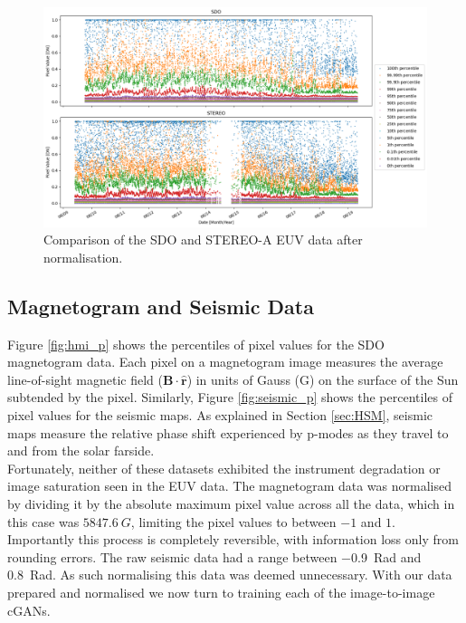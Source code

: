 \documentclass[11pt,a4paper,onecolumn]{report}
\begin{document}
\begin{figure}[t]
  \centering
  \includegraphics[width=\linewidth]{AIA_STEREO_normalised.png}
  \caption{Comparison of the SDO and STEREO-A EUV data after normalisation.}
  \label{fig:sdo_stereo_comparison}
\end{figure}



\subsection{Magnetogram and Seismic Data}
Figure \ref{fig:hmi_p} shows the percentiles of pixel values for the SDO
magnetogram data. Each pixel on a magnetogram image measures the average
line-of-sight magnetic field ($\mathbf{B}\cdot\mathbf{\hat{r}}$) in units of
Gauss (G) on the surface of the Sun subtended by the pixel. Similarly, Figure
\ref{fig:seismic_p} shows the percentiles of pixel values for the seismic maps.
As explained in Section \ref{sec:HSM}, seismic maps measure the relative phase
shift experienced by p-modes as they travel to and from the solar farside. \\

Fortunately, neither of these datasets exhibited the instrument degradation or
image saturation seen in the EUV data. The magnetogram data was normalised by
dividing it by the absolute maximum pixel value across all the data, which in
this case was $\SI[]{5847.6}[]{G}$, limiting the pixel values to between $-1$
and $1$. Importantly this process is completely reversible, with information
loss only from rounding errors. The raw seismic data had a range between
\SI{-0.9}{Rad} and \SI{0.8}{Rad}. As such normalising this data was deemed
unnecessary. %
With our data prepared and normalised we now turn to training each of the
image-to-image cGANs.
\end{document}
